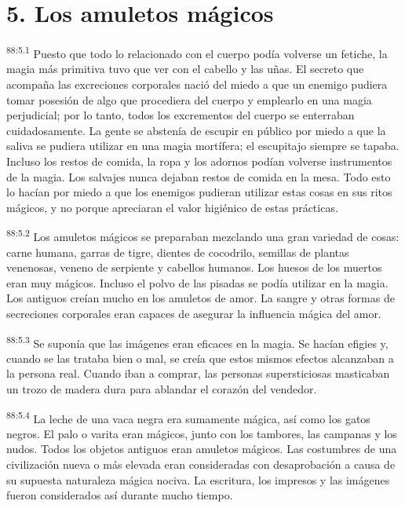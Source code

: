 \section*{5. Los amuletos mágicos}
\par
\textsuperscript{88:5.1} Puesto que todo lo relacionado con el cuerpo podía volverse un fetiche, la magia más primitiva tuvo que ver con el cabello y las uñas. El secreto que acompaña las excreciones corporales nació del miedo a que un enemigo pudiera tomar posesión de algo que procediera del cuerpo y emplearlo en una magia perjudicial; por lo tanto, todos los excrementos del cuerpo se enterraban cuidadosamente. La gente se abstenía de escupir en público por miedo a que la saliva se pudiera utilizar en una magia mortífera; el escupitajo siempre se tapaba. Incluso los restos de comida, la ropa y los adornos podían volverse instrumentos de la magia. Los salvajes nunca dejaban restos de comida en la mesa. Todo esto lo hacían por miedo a que los enemigos pudieran utilizar estas cosas en sus ritos mágicos, y no porque apreciaran el valor higiénico de estas prácticas.

\par
\textsuperscript{88:5.2} Los amuletos mágicos se preparaban mezclando una gran variedad de cosas: carne humana, garras de tigre, dientes de cocodrilo, semillas de plantas venenosas, veneno de serpiente y cabellos humanos. Los huesos de los muertos eran muy mágicos. Incluso el polvo de las pisadas se podía utilizar en la magia. Los antiguos creían mucho en los amuletos de amor. La sangre y otras formas de secreciones corporales eran capaces de asegurar la influencia mágica del amor.

\par
\textsuperscript{88:5.3} Se suponía que las imágenes eran eficaces en la magia. Se hacían efigies y, cuando se las trataba bien o mal, se creía que estos mismos efectos alcanzaban a la persona real. Cuando iban a comprar, las personas supersticiosas masticaban un trozo de madera dura para ablandar el corazón del vendedor.

\par
\textsuperscript{88:5.4} La leche de una vaca negra era sumamente mágica, así como los gatos negros. El palo o varita eran mágicos, junto con los tambores, las campanas y los nudos. Todos los objetos antiguos eran amuletos mágicos. Las costumbres de una civilización nueva o más elevada eran consideradas con desaprobación a causa de su supuesta naturaleza mágica nociva. La escritura, los impresos y las imágenes fueron considerados así durante mucho tiempo.


